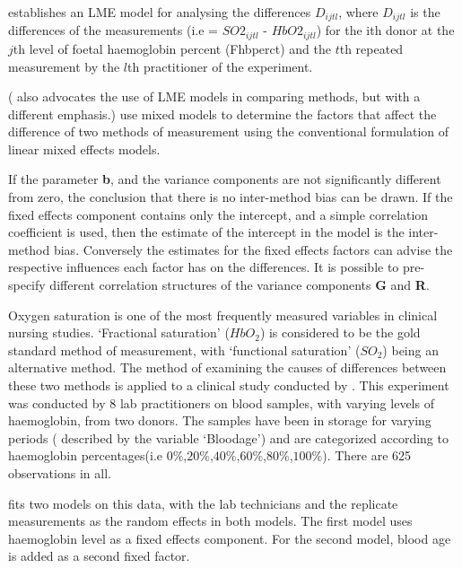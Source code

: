 \documentclass[12pt, a4paper]{report}
\theoremstyle{plain}
\theoremstyle{definition}
\theoremstyle{remark}
\begin{document}
	\citet{LaiShiao} establishes an LME model for analysing the differences $D_{ijtl}$, where $D_{ijtl}$ is the differences of the measurements (i.e = $SO2_{ijtl}$ - $HbO2_{ijtl}$) for the ith donor at the $j$th level of foetal haemoglobin percent (Fhbperct) and the $t$th repeated measurement by the $l$th practitioner of the experiment.
	
	
	(\citet{BXC2004} also advocates the use of LME models in comparing methods, but with a different emphasis.)
	\citet{LaiShiao} use mixed models to determine the factors that
	affect the difference of two methods of measurement using the
	conventional formulation of linear mixed effects models.
	
	If the parameter \textbf{b}, and the variance components are not
	significantly different from zero, the conclusion that there is no
	inter-method bias can be drawn. If the fixed effects component
	contains only the intercept, and a simple correlation coefficient
	is used, then the estimate of the intercept in the model is the
	inter-method bias. Conversely the estimates for the fixed effects
	factors can advise the respective influences each factor has on
	the differences. It is possible to pre-specify different
	correlation structures of the variance components \textbf{G} and
	\textbf{R}.
	
	
	Oxygen saturation is one of the most frequently measured variables
	in clinical nursing studies. `Fractional saturation' ($HbO_{2}$)
	is considered to be the gold standard method of measurement, with
	`functional saturation' ($SO_{2}$) being an alternative method.
	The method of examining the causes of differences between these
	two methods is applied to a clinical study conducted by
	\citet{Shiao}. This experiment was conducted by 8 lab
	practitioners on blood samples, with varying levels of
	haemoglobin, from two donors. The samples have been in storage for
	varying periods ( described by the variable `Bloodage') and are
	categorized according to haemoglobin percentages(i.e
	$0\%$,$20\%$,$40\%$,$60\%$,$80\%$,$100\%$). There are 625
	observations in all.
	
	\citet{LaiShiao} fits two models on this data, with the lab
	technicians and the replicate measurements as the random effects
	in both models. The first model uses haemoglobin level as a fixed
	effects component. For the second model, blood age is added as a
	second fixed factor.
	
\end{document}
